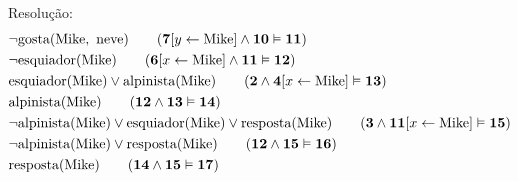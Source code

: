 \documentclass[10pt, twoside]{article}          %
\let\oldphantom\vphantom
\let\vphantom\relax
\let\vphantom\oldphantom
\renewcommand{\l}{\mathopen{}\left}             %
\renewcommand{\r}{\vphantom{1j}\right}          %
\newenvironment{proof*}[1][proof*]              %
  {\proof[#1]\vspace{0.5em}\vspace*{-\baselineskip}
  \hspace{\parindent}\leftskip=.5cm\rightskip=.5cm}
  {\vspace*{-1.5\baselineskip}
  
  \rightskip=0cm\endproof}
\begin{document}
\begin{multicols*}{2}
\begin{enumerate}
\begin{proof*}[\unskip\nopunct]
\begin{enumerate}
        Resolução:
        \begin{align*}
          & \lnot\text{gosta}(\text{Mike},\ \text{neve})                                            \tag{$\textbf{7}\l[y\leftarrow\text{Mike}\r]\land\textbf{10}\vDash\textbf{11}$} \\
          & \lnot\text{esquiador}(\text{Mike})                                                      \tag{$\textbf{6}\l[x\leftarrow\text{Mike}\r]\land\textbf{11}\vDash\textbf{12}$} \\
          & \text{esquiador}(\text{Mike})\lor\text{alpinista}(\text{Mike})                          \tag{$\textbf{2}\land\textbf{4}\l[x\leftarrow\text{Mike}\r]\vDash\textbf{13}$}  \\
          & \text{alpinista}(\text{Mike})                                                           \tag{$\textbf{12}\land\textbf{13}\vDash\textbf{14}$}                            \\
          & \lnot\text{alpinista}(\text{Mike})\lor\text{esquiador}(\text{Mike})
            \lor\text{resposta}(\text{Mike})                                                        \tag{$\textbf{3}\land\textbf{11}\l[x\leftarrow\text{Mike}\r]\vDash\textbf{15}$} \\
          & \lnot\text{alpinista}(\text{Mike})\lor\text{resposta}(\text{Mike})                      \tag{$\textbf{12}\land\textbf{15}\vDash\textbf{16}$}                            \\
          & \text{resposta}(\text{Mike})                                                            \tag{$\textbf{14}\land\textbf{15}\vDash\textbf{17}$}                            \\
        \end{align*}
    \end{enumerate}
  \end{proof*}
\end{enumerate}
\end{multicols*}
\end{document}
